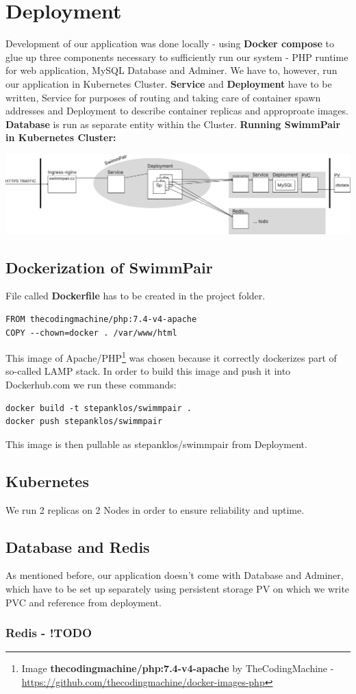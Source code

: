 \chapter{Deployment}
Development of our application was done locally - using \textbf{Docker compose} to glue up three components necessary to sufficiently run our system - PHP runtime for web application, MySQL Database and Adminer. We have to, however, run our application in Kubernetes Cluster. \textbf{Service} and \textbf{Deployment} have to be written, Service for purposes of routing and taking care of container spawn addresses and Deployment to describe container replicas and approproate images. \textbf{Database} is run as separate entity within the Cluster.
\newline
\textbf{Running SwimmPair in Kubernetes Cluster:}
\par
\includegraphics[scale=0.275]{img/swimmpair_deployment_k8s.png}
\section*{Dockerization of SwimmPair}
File called \textbf{Dockerfile} has to be created in the project folder.
\begin{lstlisting}
FROM thecodingmachine/php:7.4-v4-apache
COPY --chown=docker . /var/www/html
\end{lstlisting}
This image of Apache/PHP\footnote{Image \textbf{thecodingmachine/php:7.4-v4-apache}  by TheCodingMachine - \url{https://github.com/thecodingmachine/docker-images-php}} was chosen because it correctly dockerizes part of so-called LAMP stack. In order to build this image and push it into Dockerhub.com we run these commands:
\begin{lstlisting}
docker build -t stepanklos/swimmpair .
docker push stepanklos/swimmpair
\end{lstlisting}
This image is then pullable as stepanklos/swimmpair from Deployment.
\section*{Kubernetes}
We run 2 replicas on 2 Nodes in order to ensure reliability and uptime. 
\section*{Database and Redis}
As mentioned before, our application doesn't come with Database and Adminer, which have to be set up separately using persistent storage PV on which we write PVC and reference from deployment. 
\newline
\subsection*{Redis - !TODO}